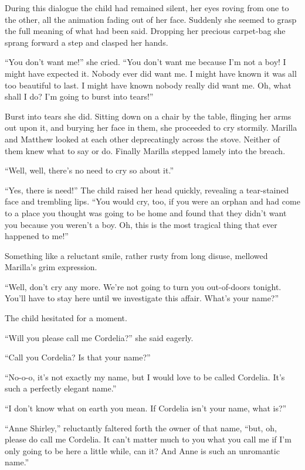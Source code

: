 \documentclass[a4paper]{article}
\begin{document}
During this dialogue the child had remained silent, her eyes roving from one to the other, all the animation fading out of her face. Suddenly she seemed to grasp the full meaning of what had been said. Dropping her precious carpet-bag she sprang forward a step and clasped her hands.

``You don't want me!'' she cried. ``You don't want me because I'm not a boy! I might have expected it. Nobody ever did want me. I might have known it was all too beautiful to last. I might have known nobody really did want me. Oh, what shall I do? I'm going to burst into tears!''

Burst into tears she did. Sitting down on a chair by the table, flinging her arms out upon it, and burying her face in them, she proceeded to cry stormily. Marilla and Matthew looked at each other deprecatingly across the stove. Neither of them knew what to say or do. Finally Marilla stepped lamely into the breach.

``Well, well, there's no need to cry so about it.''

``Yes, there is need!'' The child raised her head quickly, revealing a tear-stained face and trembling lips. ``You would cry, too, if you were an orphan and had come to a place you thought was going to be home and found that they didn't want you because you weren't a boy. Oh, this is the most tragical thing that ever happened to me!''

Something like a reluctant smile, rather rusty from long disuse, mellowed Marilla's grim expression.

``Well, don't cry any more. We're not going to turn you out-of-doors tonight. You'll have to stay here until we investigate this affair. What's your name?''

The child hesitated for a moment.

``Will you please call me Cordelia?'' she said eagerly.

``Call you Cordelia? Is that your name?''

``No-o-o, it's not exactly my name, but I would love to be called Cordelia. It's such a perfectly elegant name.''

``I don't know what on earth you mean. If Cordelia isn't your name, what is?''

``Anne Shirley,'' reluctantly faltered forth the owner of that name, ``but, oh, please do call me Cordelia. It can't matter much to you what you call me if I'm only going to be here a little while, can it? And Anne is such an unromantic name.''
\end{document}
